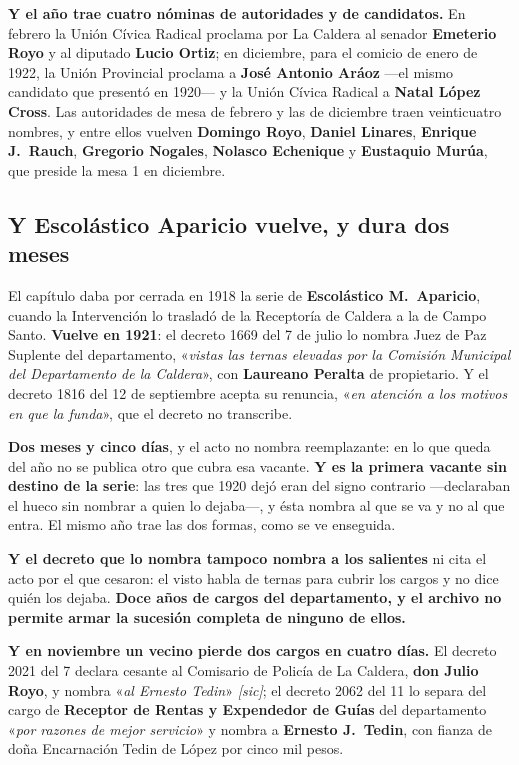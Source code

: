 \textbf{Y el año trae cuatro nóminas de autoridades y de candidatos.} En febrero la Unión Cívica
Radical proclama por La Caldera al senador \textbf{Emeterio Royo} y al diputado \textbf{Lucio
Ortiz}; en diciembre, para el comicio de enero de 1922, la Unión Provincial proclama a
\textbf{José Antonio Aráoz} ---el mismo candidato que presentó en 1920--- y la Unión Cívica
Radical a \textbf{Natal López Cross}. Las autoridades de mesa de febrero y las de diciembre
traen veinticuatro nombres, y entre ellos vuelven \textbf{Domingo Royo}, \textbf{Daniel
Linares}, \textbf{Enrique J.\ Rauch}, \textbf{Gregorio Nogales},
\textbf{Nolasco Echenique} y \textbf{Eustaquio Murúa}, que preside la
mesa 1 en diciembre.

\subsection*{Y Escolástico Aparicio vuelve, y dura dos meses}

El capítulo daba por cerrada en 1918 la serie de \textbf{Escolástico M.\
Aparicio}, cuando la Intervención lo trasladó de la Receptoría de
Caldera a la de Campo Santo. \textbf{Vuelve en 1921}: el decreto 1669 del 7 de julio lo nombra
Juez de Paz Suplente del departamento, «\textit{vistas las ternas elevadas por la Comisión
Municipal del Departamento de la Caldera}», con \textbf{Laureano Peralta} de propietario. Y el
decreto 1816 del 12 de septiembre acepta su renuncia, «\textit{en atención a los motivos en que
la funda}», que el decreto no transcribe.

\begin{cautela}
\textbf{Dos meses y cinco días}, y el acto no nombra reemplazante: en lo que queda del año no se
publica otro que cubra esa vacante. \textbf{Y es la primera vacante sin destino de la serie}: las
tres que 1920 dejó eran del signo contrario ---declaraban el hueco sin nombrar a quien lo
dejaba---, y ésta nombra al que se va y no al que entra. El mismo año trae las dos formas,
como se ve enseguida.

\textbf{Y el decreto que lo nombra tampoco nombra a los salientes} ni cita el acto por el que
cesaron: el visto habla de ternas para cubrir los cargos y no dice quién los dejaba. \textbf{Doce
años de cargos del departamento, y el archivo no permite armar la sucesión completa de ninguno de
ellos.}
\end{cautela}

\textbf{Y en noviembre un vecino pierde dos cargos en cuatro días.} El decreto 2021 del 7 declara
cesante al Comisario de Policía de La Caldera, \textbf{don Julio Royo}, y nombra «\textit{al
Ernesto Tedin}» \textit{[sic]}; el decreto 2062 del 11 lo separa del cargo de \textbf{Receptor de
Rentas y Expendedor de Guías} del departamento «\textit{por razones de mejor servicio}» y nombra
a \textbf{Ernesto J.\ Tedin}, con fianza de doña Encarnación Tedin de López por cinco mil pesos.

